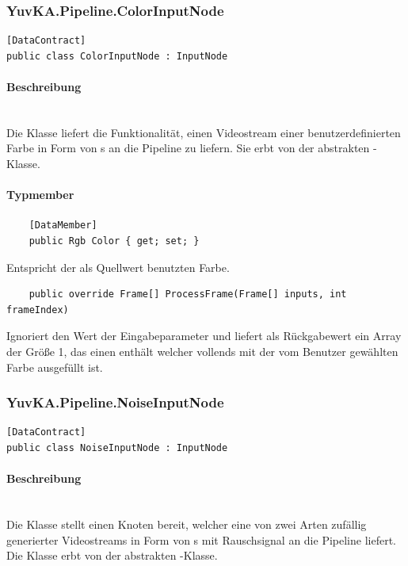 \subsubsection{YuvKA.Pipeline.ColorInputNode}

\begin{verbatim}
[DataContract]
public class ColorInputNode : InputNode
\end{verbatim}

\paragraph{Beschreibung}~\\
Die Klasse  liefert die Funktionalität, einen Videostream einer benutzerdefinierten Farbe in Form von s an die Pipeline zu liefern. Sie erbt von der abstrakten -Klasse.

\paragraph{Typmember}
\begin{itemize}

	\begin{verbatim}
	[DataMember]
	public Rgb Color { get; set; }
	\end{verbatim}
	Entspricht der als Quellwert benutzten Farbe.


	\begin{verbatim}
	public override Frame[] ProcessFrame(Frame[] inputs, int frameIndex)
	\end{verbatim}
	Ignoriert den Wert der Eingabeparameter und liefert als Rückgabewert ein Array der Größe 1, das einen  enthält welcher vollends mit der vom Benutzer gewählten Farbe ausgefüllt ist.

\end{itemize}

\subsubsection{YuvKA.Pipeline.NoiseInputNode}

\begin{verbatim}
[DataContract]
public class NoiseInputNode : InputNode
\end{verbatim}

\paragraph{Beschreibung}~\\
Die Klasse  stellt einen Knoten bereit, welcher eine von zwei Arten zufällig generierter Videostreams in Form von s mit Rauschsignal an die Pipeline liefert. Die Klasse erbt von der abstrakten -Klasse.

